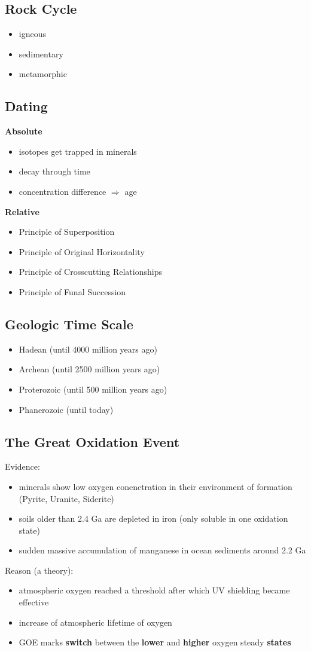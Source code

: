 \documentclass{article}
\theoremstyle{sltheorem}
\begin{document}
\subsection{Rock Cycle}
\begin{itemize}
	\item igneous
	\item sedimentary
	\item metamorphic
\end{itemize}
\subsection{Dating}
\textbf{Absolute}
\begin{itemize}
	\item isotopes get trapped in minerals
	\item decay through time
	\item concentration difference $\Rightarrow$ age
\end{itemize}
\textbf{Relative}
\begin{itemize}
	\item Principle of Superposition
	\item Principle of Original Horizontality
	\item Principle of Crosscutting Relationships
	\item Principle of Funal Succession
\end{itemize}
\subsection{Geologic Time Scale}
\begin{itemize}
	\item Hadean (until 4000 million years ago)
	\item Archean (until 2500 million years ago)
	\item Proterozoic (until 500 million years ago)
	\item Phanerozoic (until today)
\end{itemize}
\subsection{The Great Oxidation Event}
Evidence:
\begin{itemize}
	\item minerals show low oxygen conenctration in their environment of formation (Pyrite, Uranite, Siderite)
	\item soils older than 2.4 Ga are depleted in iron (only soluble in one oxidation state)
	\item sudden massive accumulation of manganese in ocean sediments around 2.2 Ga
\end{itemize}
Reason (a theory):
\begin{itemize}
	\item atmospheric oxygen reached a threshold after which UV shielding became effective
	\item increase of atmospheric lifetime of oxygen
	\item GOE marks \textbf{switch} between the \textbf{lower} and \textbf{higher} oxygen steady \textbf{states}
\end{itemize}
\end{document}
